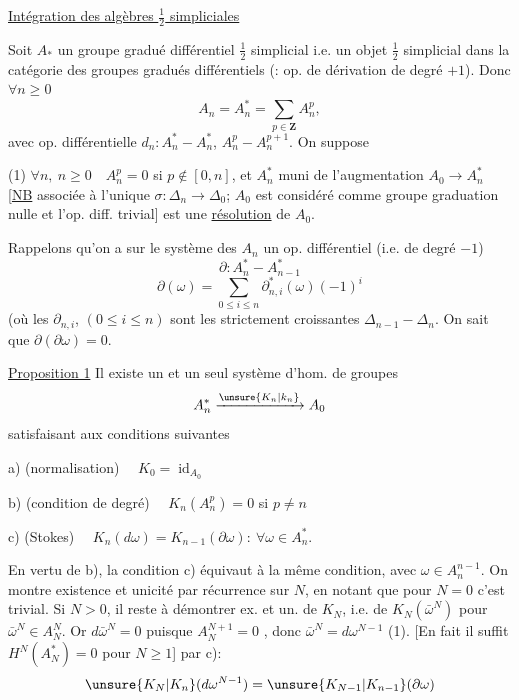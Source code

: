 \uline{Intégration des algèbres $\frac12$ simpliciales}

Soit $A_*$ un groupe gradué différentiel $\frac12$ simplicial
i.e. un objet $\frac12$ simplicial dans la catégorie des groupes
gradués différentiels (: op. de dérivation de degré $+1$).
 Donc $\forall n\geq0$
\[
A_n=A_n^*=\sum_{p\in\mathbf Z}A_n^p,
\]
avec op. différentielle
$d_n:A_n^*\mathbin{-}A_n^*$,
$A_n^p\mathbin{-}A_n^{p+1}$.
On suppose

(1) $\forall n,\ n\geq0\quad A_n^p=0$ si $p\notin[0,n]$,
et  $A_n^*$ muni
de l'augmentation 
$A_0\longrightarrow A_n^*$
[\uline{NB} associée à l'unique $\sigma:\Delta_n\longrightarrow\Delta_0$;
$A_0$ est considéré comme groupe 
graduation nulle et l'op. diff. trivial]
est une \uline{résolution} de $A_0$.

Rappelons qu'on a sur le système des $A_n$ un op.
différentiel (i.e. de degré $-1$)
\[
\partial:A_n^*\mathbin{-}A_{n-1}^*
\]
\[
\partial(\omega)=\sum_{0\leq i\leq n}\partial_{n,i}^*(\omega)(-1)^i
\]
(où les $\partial_{n,i}$, $(0\leq i\leq n)$ sont les 
strictement croissantes $\Delta_{n-1}\mathbin{-}\Delta_n$.
On sait que $\partial(\partial\omega)=0$.

\uline{Proposition 1} Il existe un et un seul système d'hom.
de groupes
\[
A_n^*\xrightarrow{\unsure{K_n|k_n}}A_0
\]
satisfaisant aux conditions suivantes

a) (normalisation) $\quad K_0=\operatorname{id}_{A_0}$

b) (condition de degré) $\quad K_n(A_n^p)=0$ si $p\ne n$

c) (Stokes) $\quad K_n(d\omega)=K_{n-1}(\partial\omega):
\ \forall\omega\in A_n^*$.

En vertu de b), la condition c) équivaut à la même
condition, avec $\omega\in A_n^{n-1}$. On montre existence et
unicité par  récurrence sur $N$,
en notant que pour $N=0$ c'est trivial.
Si $N>0$, 
il reste à démontrer ex. et un. de $K_N$, i.e. de
$K_N(\bar\omega^N)$ pour $\bar\omega^N\in A_N^N$.
Or $d\bar\omega^N=0$ puisque $A_N^{N+1}=0$
, donc $\bar\omega^N=d\omega^{N-1}$ (1).
[En fait il suffit  $H^N(A_N^*)=0$ pour $N\geq1$]
 \uline{} par c):
\[
\unsure{K_N|K_n}(d\omega^{N-1})=\unsure{K_{N-1}|K_{n-1}}(\partial\omega)
\]
